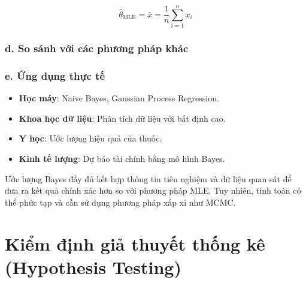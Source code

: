 \begin{equation}
    \hat{\theta}_{\text{MLE}} = \bar{x} = \frac{1}{n} \sum_{i=1}^{n} x_i
\end{equation}

\subsubsection{d. So sánh với các phương pháp khác}
\begin{table}[h]
    \centering
    \caption{So sánh các phương pháp ước lượng}
    \label{tab:comparison}
\end{table}

\subsubsection{e. Ứng dụng thực tế}
\begin{itemize}
    \item \textbf{Học máy}: Naive Bayes, Gaussian Process Regression.
    \item \textbf{Khoa học dữ liệu}: Phân tích dữ liệu với bất định cao.
    \item \textbf{Y học}: Ước lượng hiệu quả của thuốc.
    \item \textbf{Kinh tế lượng}: Dự báo tài chính bằng mô hình Bayes.
\end{itemize}

Ước lượng Bayes đầy đủ kết hợp thông tin tiên nghiệm và dữ liệu quan sát để đưa ra kết quả chính xác hơn so với phương pháp MLE. Tuy nhiên, tính toán có thể phức tạp và cần sử dụng phương pháp xấp xỉ như MCMC.





\section{Kiểm định giả thuyết thống kê (Hypothesis Testing)}
